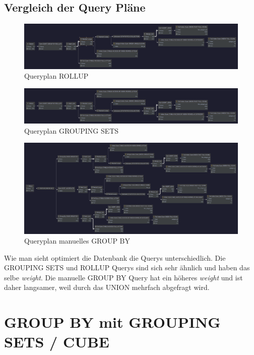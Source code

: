 \documentclass[12pt]{scrartcl}
\begin{document}
\subsection{Vergleich der Query Pläne}

\begin{figure}[h]
	\centering
	\includegraphics[width=1\linewidth]{../ue2_5_1.png}
	\caption{Queryplan ROLLUP}
\end{figure}
\begin{figure}[h]
	\centering
	\includegraphics[width=1\linewidth]{../ue2_5_2.png}
	\caption{Queryplan GROUPING SETS}
\end{figure}
\begin{figure}[h]
	\centering
	\includegraphics[width=1\linewidth]{../ue2_5_3.png}
	\caption{Queryplan manuelles GROUP BY}
\end{figure}

Wie man sieht optimiert die Datenbank die Querys unterschiedlich.
Die GROUPING SETS und ROLLUP Querys sind sich sehr ähnlich und haben das selbe \emph{weight}.
Die manuelle GROUP BY Query hat ein höheres \emph{weight} und ist daher langsamer, weil durch das UNION mehrfach abgefragt wird.

\section{GROUP BY mit GROUPING SETS / CUBE}
\inputminted{sql}{../ue2_6.sql}
\pagebreak
\end{document}
